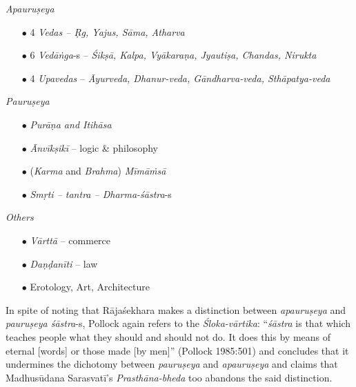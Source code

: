 {\sl Apauruṣeya}\\[-17pt]
\begin{itemize}
\itemsep=0pt
\item[$\bullet$] 4 {\sl Vedas -- Ṛg, Yajus, Sāma, Atharva}

\item[$\bullet$] 6 {\sl Vedāṅga}-s -- {\sl Śikṣā, Kalpa, Vyākaraṇa, Jyautiṣa, Chandas, Nirukta}

\item[$\bullet$] 4 {\sl Upavedas} -- {\sl Āyurveda, Dhanur-veda, Gāndharva-veda, Sthāpatya-veda}
\end{itemize}
{\sl Pauruṣeya}\\[-17pt]
\begin{itemize}
\itemsep=0pt
\item[$\bullet$] {\sl Purāṇa and Itihāsa}

\item[$\bullet$] {\sl Ānvīkṣikī} -- logic \& philosophy

\item[$\bullet$] ({\sl Karma} and {\sl Brahma}) {\sl Mīmāṁsā}

\item[$\bullet$] {\sl Smṛti -- tantra -- Dharma-śāstra}-s
\end{itemize}
{\sl Others}\\[-17pt]
\begin{itemize}
\itemsep=0pt
\item[$\bullet$] {\sl Vārttā} -- commerce

\item[$\bullet$] {\sl Daṇḍanīti} -- law

\item[$\bullet$] Erotology, Art, Architecture
\end{itemize}

In spite of noting that Rājaśekhara makes a distinction between {\sl apauruṣeya} and {\sl pauruṣeya śāstra}-s, Pollock again refers to the {\sl Śloka-vārtika}: ``{\sl śāstra} is that which teaches people what they should and should not do. It does this by means of eternal [words] or those made [by men]'' (Pollock 1985:501) and concludes that it undermines the dichotomy between {\sl pauruṣeya} and {\sl apauruṣeya} and claims that Madhusūdana Sarasvatī's  {\sl Prasthāna-bheda} too abandons the said distinction. 

